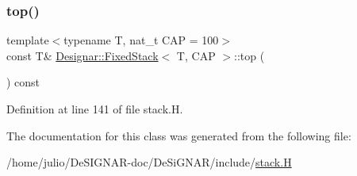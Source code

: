 \subsubsection{\texorpdfstring{top()}{top()}\hspace{0.1cm}{\footnotesize\ttfamily [2/2]}}
{\footnotesize\ttfamily template$<$typename T, nat\+\_\+t C\+AP = 100$>$ \\
const T\& \hyperlink{class_designar_1_1_fixed_stack}{Designar\+::\+Fixed\+Stack}$<$ T, C\+AP $>$\+::top (\begin{DoxyParamCaption}{ }\end{DoxyParamCaption}) const\hspace{0.3cm}{\ttfamily [inline]}}



Definition at line 141 of file stack.\+H.



The documentation for this class was generated from the following file\+:\begin{DoxyCompactItemize}
\item 
/home/julio/\+De\+S\+I\+G\+N\+A\+R-\/doc/\+De\+Si\+G\+N\+A\+R/include/\hyperlink{stack_8_h}{stack.\+H}\end{DoxyCompactItemize}
